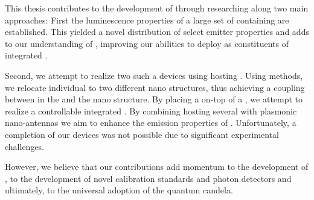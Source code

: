 	This thesis contributes to the development of \spss through researching \sivs along two main approaches: First the luminescence properties of a large set of \nds containing \sivs are established. This yielded a novel distribution of select emitter properties and adds to our understanding of \sivs, improving our abilities to deploy \sivs as constituents of integrated \sps.

	Second, we attempt to realize two such a devices using \nds hosting \sivs. Using \pp methods, we relocate individual \nds to two different nano structures, thus achieving a coupling between \sivs in the \nd and the nano structure. By placing a \nd on-top of a \vcsel, we attempt to realize a controllable integrated \sps. By combining \nds hosting several \sivs with plasmonic nano-antennas we aim to enhance the emission properties of \sivs. Unfortunately, a completion of our devices was not possible due to significant experimental challenges.

	However, we believe that our contributions add momentum to the development of \sps, to the development of novel calibration standards and photon detectors and ultimately, to the universal adoption of the quantum candela.


\vfill
